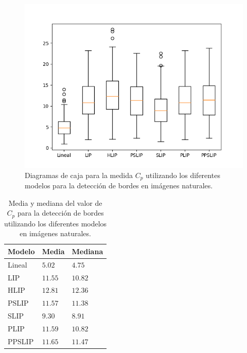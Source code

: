 \begin{figure}[h]
	\begin{center}
		\includegraphics[width=10.0 cm]{images/graphics/natural/ed/ed_all.png}
		\caption{Diagramas de caja para la medida $C_p$ utilizando los diferentes modelos para la detecci\'on de bordes en im\'agenes naturales.}
	\end{center}
\end{figure}

\begin{table}[h]
	\begin{center}
		\begin{tabular}{|l|l|l|}
			\hline 
			Modelo & Media & Mediana\\
			\hline
			Lineal & $5.02$ & $4.75$\\
			\hline
			LIP & $11.55$ & $10.82$\\
			\hline
			HLIP & $12.81$ & $12.36$\\
			\hline
			PSLIP & $11.57$ & $11.38$\\
			\hline
			SLIP & $9.30$ & $8.91$\\
			\hline
			PLIP & $11.59$ & $10.82$\\
			\hline
			PPSLIP & $11.65$ & $11.47$\\
			\hline
		\end{tabular}
		\caption{Media y mediana del valor de $C_p$ para la detecci\'on de bordes utilizando los diferentes modelos en im\'agenes naturales.}
	\end{center}
\end{table}



